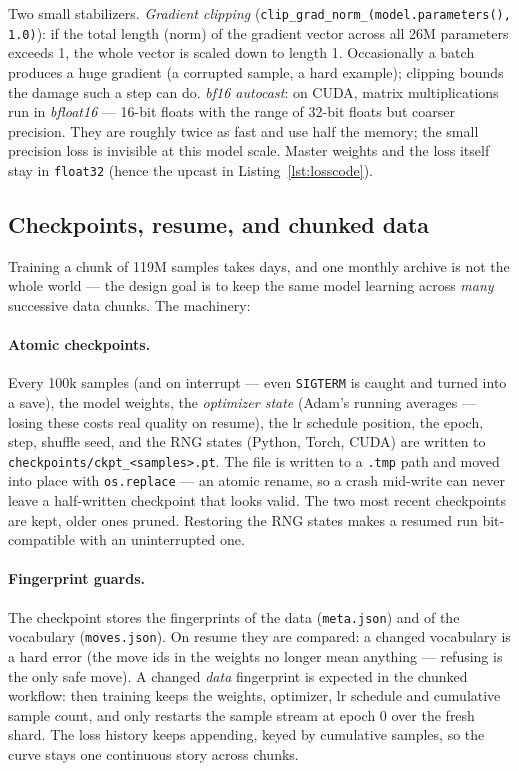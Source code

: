 \documentclass[10pt,a4paper]{article}
\newcommand{\code}[1]{\texttt{#1}}
\begin{document}
Two small stabilizers. \emph{Gradient clipping}
(\code{clip\_grad\_norm\_(model.parameters(), 1.0)}): if the total
length (norm) of the gradient vector across all 26M parameters exceeds
1, the whole vector is scaled down to length 1. Occasionally a batch
produces a huge gradient (a corrupted sample, a hard example); clipping
bounds the damage such a step can do. \emph{bf16 autocast}: on CUDA,
matrix multiplications run in \emph{bfloat16} --- 16-bit floats with the
range of 32-bit floats but coarser precision. They are roughly twice as
fast and use half the memory; the small precision loss is invisible at
this model scale. Master weights and the loss itself stay in
\code{float32} (hence the upcast in Listing~\ref{lst:losscode}).

\subsection{Checkpoints, resume, and chunked data}\label{sec:resume}

Training a chunk of 119M samples takes days, and one monthly archive is
not the whole world --- the design goal is to keep the same model
learning across \emph{many} successive data chunks. The machinery:

\paragraph{Atomic checkpoints.} Every 100k samples (and on interrupt ---
even \code{SIGTERM} is caught and turned into a save), the model weights,
the \emph{optimizer state} (Adam's running averages --- losing these
costs real quality on resume), the lr schedule position, the epoch,
step, shuffle seed, and the RNG states (Python, Torch, CUDA) are written
to \code{checkpoints/ckpt\_<samples>.pt}. The file is written to a
\code{.tmp} path and moved into place with \code{os.replace} --- an
atomic rename, so a crash mid-write can never leave a half-written
checkpoint that looks valid. The two most recent checkpoints are kept,
older ones pruned. Restoring the RNG states makes a resumed run
bit-compatible with an uninterrupted one.

\paragraph{Fingerprint guards.} The checkpoint stores the fingerprints of
the data (\code{meta.json}) and of the vocabulary (\code{moves.json}). On
resume they are compared: a changed vocabulary is a hard error (the move
ids in the weights no longer mean anything --- refusing is the only
safe move). A changed \emph{data} fingerprint is expected in the
chunked workflow: then training keeps the weights, optimizer, lr
schedule and cumulative sample count, and only restarts the sample
stream at epoch 0 over the fresh shard. The loss history keeps
appending, keyed by cumulative samples, so the curve stays one
continuous story across chunks.
\end{document}
